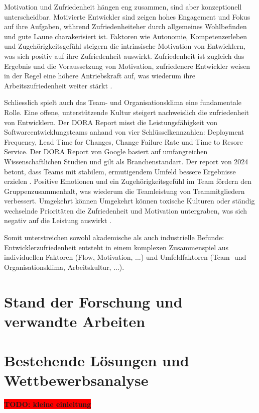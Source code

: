 \documentclass[12pt,a4paper]{report}
\newcommand{\todo}[1]{\colorbox{red}{\textbf{TODO: #1}}\\}
\begin{document}
Motivation und Zufriedenheit hängen eng zusammen, sind aber konzeptionell unterscheidbar. Motivierte Entwickler sind
zeigen hohes Engagement und Fokus auf ihre Aufgaben, während Zufriedenheiteher durch allgemeines Wohlbefinden und gute
Laune charakerisiert ist. Faktoren wie Autonomie, Kompetenzerleben und Zugehörigkeitsgefühl steigern die intrinsische 
Motivation von Entwicklern, was sich positiv auf ihre Zufriedenheit auswirkt. Zufriedenheit ist zugleich das Ergebnis und
die Voraussetzung von Motivation, zufriedenere Entwickler weisen in der Regel eine höhere Antriebskraft auf, was wiederum ihre
Arbeitszufriedenheit weiter stärkt \cite{franca_motivation_2020}.

Schliesslich spielt auch das Team- und Organisationsklima eine fundamentale Rolle. Eine offene, unterstützende Kultur steigert
nachweislich die zufriedenheit von Entwicklern. Der DORA Report misst die Leistungsfähigkeit von Softwareentwicklungsteams anhand
von vier Schlüsselkennzahlen: Deployment Frequency, Lead Time for Changes, Change Failure Rate und Time to Resore Service. Der DORA
Report von Google basiert auf umfangreichen Wissenschaftlichen Studien und gilt als Branchenstandart. Der report von 2024 betont,
dass Teams mit stabilem, ermutigendem Umfeld bessere Ergebnisse erzielen \cite{google_dora_2024}. Positive Emotionen und ein 
Zugehörigkeitsgefühl im Team fördern den Gruppenzusammenhalt, was wiederum die Teamleistung von Teammitgliedern verbessert. 
Umgekehrt können Umgekehrt können toxische Kulturen oder ständig wechselnde Prioritäten die Zufriedenheit und Motivation 
untergraben, was sich negativ auf die Leistung auswirkt \cite{sadowski_happiness_2019}.

Somit unterstreichen sowohl akademische als auch industrielle Befunde: Entwicklerzufriedenheit entsteht in einem komplexen
Zusammenspiel aus individuellen Faktoren (Flow, Motivation, ...) und Umfeldfaktoren (Team- und Organisationsklima, Arbeitskultur, 
...).

\section{Stand der Forschung und verwandte Arbeiten}
\section{Bestehende Lösungen und Wettbewerbsanalyse}

\todo{kleine einleitung}
\end{document}
